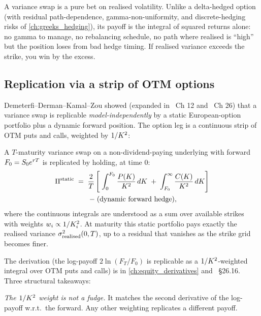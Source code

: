 A variance swap is a pure bet on realised volatility. Unlike a
delta-hedged option (with residual path-dependence,
gamma-non-uniformity, and discrete-hedging risks of
\cref{ch:greeks_hedging}), its payoff is the integral of squared
returns alone: no gamma to manage, no rebalancing schedule, no
path where realised is ``high'' but the position loses from bad
hedge timing. If realised variance exceeds the strike, you win
by the excess.

\subsection{Replication via a strip of OTM options}
\label{subsec:ch17_varswap_replication}

Demeterfi--Derman--Kamal--Zou showed (expanded in \citeBennett\
Ch 12 and \citeHull\ Ch 26) that a variance swap is replicable
\emph{model-independently} by a static European-option portfolio
plus a dynamic forward position. The option leg is a continuous
strip of OTM puts and calls, weighted by $1/K^2$:

\begin{keyfactbox}
A $T$-maturity variance swap on a non-dividend-paying underlying
with forward $F_0 = S_0 e^{r T}$ is replicated by holding,
at time $0$:
\begin{multline}
  \Pi^{\text{static}}
  \;=\; \frac{2}{T}\left[\;
          \int_0^{F_0}\frac{P(K)}{K^2}\,dK
          \;+\;
          \int_{F_0}^{\infty}\frac{C(K)}{K^2}\,dK
        \right] \\
  \;-\; \text{(dynamic forward hedge)},
  \label{eq:varswap_replication}
\end{multline}
where the continuous integrals are understood as a sum over
available strikes with weights $w_i \propto 1/K_i^2$. At
maturity this static portfolio pays exactly the realised variance
$\sigma_{\text{realised}}^2(0,T)$, up to a residual that
vanishes as the strike grid becomes finer.
\end{keyfactbox}

The derivation (the log-payoff $2\ln(F_T/F_0)$ is replicable as
a $1/K^2$-weighted integral over OTM puts and calls) is
in \cref{ch:equity_derivatives} and \citeHull\ \S26.16. Three
structural takeaways:

\emph{The $1/K^2$ weight is not a fudge.} It matches the
second derivative of the log-payoff w.r.t.\ the forward. Any other
weighting replicates a different payoff.


